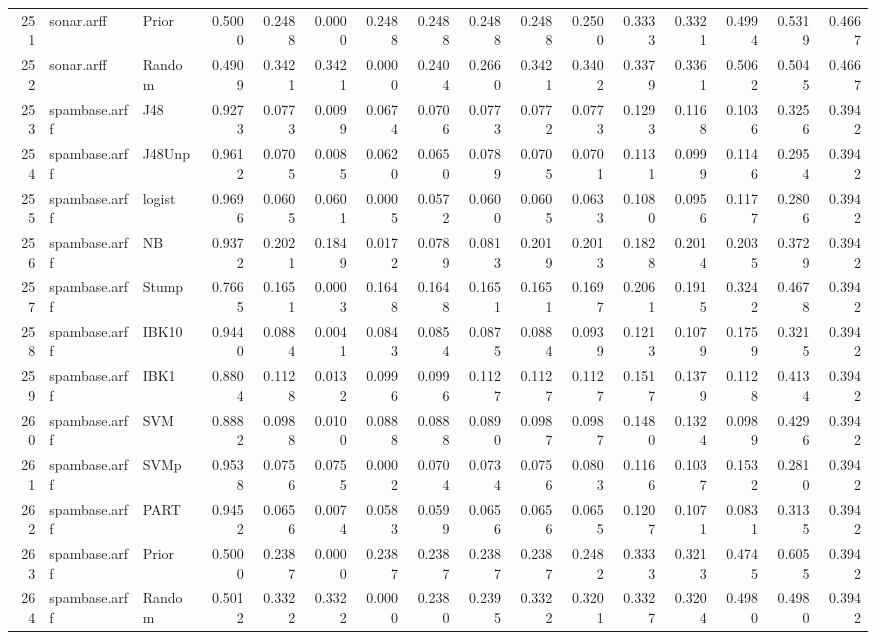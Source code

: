 \documentclass {article}
\begin{document}
\begin{table}[ht]
\begin{tabular}{rllrrrrrrrrrrrrr}
  251 & sonar.arff & Prior & 0.5000 & 0.2488 & 0.0000 & 0.2488 & 0.2488 & 0.2488 & 0.2488 & 0.2500 & 0.3333 & 0.3321 & 0.4994 & 0.5319 & 0.4667 \\ 
  252 & sonar.arff & Random & 0.4909 & 0.3421 & 0.3421 & 0.0000 & 0.2404 & 0.2660 & 0.3421 & 0.3402 & 0.3379 & 0.3361 & 0.5062 & 0.5045 & 0.4667 \\ 
  253 & spambase.arff & J48 & 0.9273 & 0.0773 & 0.0099 & 0.0674 & 0.0706 & 0.0773 & 0.0772 & 0.0773 & 0.1293 & 0.1168 & 0.1036 & 0.3256 & 0.3942 \\ 
  254 & spambase.arff & J48Unp & 0.9612 & 0.0705 & 0.0085 & 0.0620 & 0.0650 & 0.0789 & 0.0705 & 0.0701 & 0.1131 & 0.0999 & 0.1146 & 0.2954 & 0.3942 \\ 
  255 & spambase.arff & logist & 0.9696 & 0.0605 & 0.0601 & 0.0005 & 0.0572 & 0.0600 & 0.0605 & 0.0633 & 0.1080 & 0.0956 & 0.1177 & 0.2806 & 0.3942 \\ 
  256 & spambase.arff & NB & 0.9372 & 0.2021 & 0.1849 & 0.0172 & 0.0789 & 0.0813 & 0.2019 & 0.2013 & 0.1828 & 0.2014 & 0.2035 & 0.3729 & 0.3942 \\ 
  257 & spambase.arff & Stump & 0.7665 & 0.1651 & 0.0003 & 0.1648 & 0.1648 & 0.1651 & 0.1651 & 0.1697 & 0.2061 & 0.1915 & 0.3242 & 0.4678 & 0.3942 \\ 
  258 & spambase.arff & IBK10 & 0.9440 & 0.0884 & 0.0041 & 0.0843 & 0.0854 & 0.0875 & 0.0884 & 0.0939 & 0.1213 & 0.1079 & 0.1759 & 0.3215 & 0.3942 \\ 
  259 & spambase.arff & IBK1 & 0.8804 & 0.1128 & 0.0132 & 0.0996 & 0.0996 & 0.1127 & 0.1127 & 0.1127 & 0.1517 & 0.1379 & 0.1128 & 0.4134 & 0.3942 \\ 
  260 & spambase.arff & SVM & 0.8882 & 0.0988 & 0.0100 & 0.0888 & 0.0888 & 0.0890 & 0.0987 & 0.0987 & 0.1480 & 0.1324 & 0.0989 & 0.4296 & 0.3942 \\ 
  261 & spambase.arff & SVMp & 0.9538 & 0.0756 & 0.0755 & 0.0002 & 0.0704 & 0.0734 & 0.0756 & 0.0803 & 0.1166 & 0.1037 & 0.1532 & 0.2810 & 0.3942 \\ 
  262 & spambase.arff & PART & 0.9452 & 0.0656 & 0.0074 & 0.0583 & 0.0599 & 0.0656 & 0.0656 & 0.0655 & 0.1207 & 0.1071 & 0.0831 & 0.3135 & 0.3942 \\ 
  263 & spambase.arff & Prior & 0.5000 & 0.2387 & 0.0000 & 0.2387 & 0.2387 & 0.2387 & 0.2387 & 0.2482 & 0.3333 & 0.3213 & 0.4745 & 0.6055 & 0.3942 \\ 
  264 & spambase.arff & Random & 0.5012 & 0.3322 & 0.3322 & 0.0000 & 0.2380 & 0.2395 & 0.3322 & 0.3201 & 0.3327 & 0.3204 & 0.4980 & 0.4980 & 0.3942 \\ 

\end{tabular}
\end{table}
\end{document}
